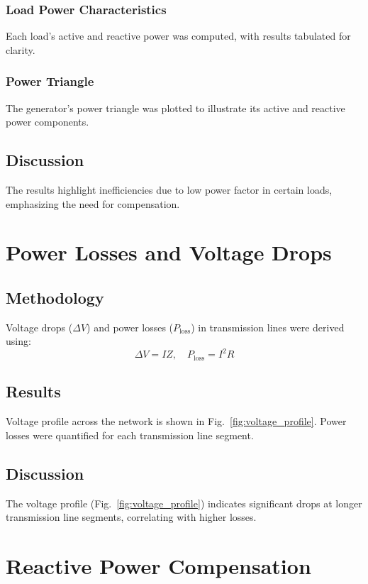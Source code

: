 \documentclass[conference]{IEEEtran}
\begin{document}
\subsubsection{Load Power Characteristics}
Each load's active and reactive power was computed, with results tabulated for clarity.

\subsubsection{Power Triangle}
The generator's power triangle was plotted to illustrate its active and reactive power components.

\subsection{Discussion}
The results highlight inefficiencies due to low power factor in certain loads, emphasizing the need for compensation.

\section{Power Losses and Voltage Drops}

\subsection{Methodology}
Voltage drops ($\Delta V$) and power losses ($P_{\text{loss}}$) in transmission lines were derived using:
\begin{equation}
\Delta V = I Z, \quad P_{\text{loss}} = I^2 R
\end{equation}

\subsection{Results}
Voltage profile across the network is shown in Fig.~\ref{fig:voltage_profile}. Power losses were quantified for each transmission line segment.

\subsection{Discussion}
The voltage profile (Fig.~\ref{fig:voltage_profile}) indicates significant drops at longer transmission line segments, correlating with higher losses.

\section{Reactive Power Compensation}
\end{document}
